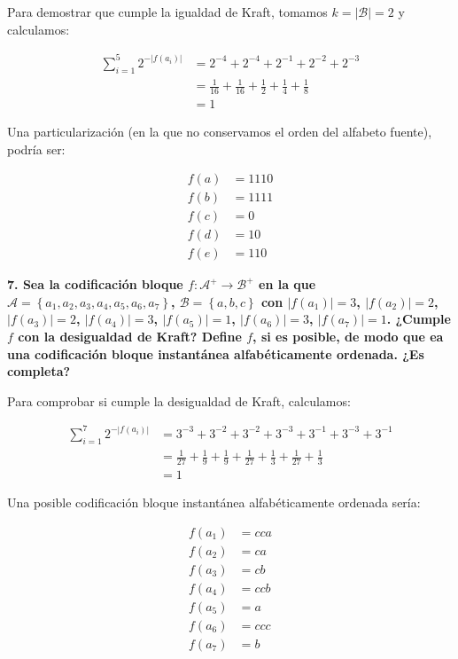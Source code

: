 \documentclass{article}
\begin{document}
Para demostrar que cumple la igualdad de Kraft, tomamos $k=\left|\mathcal{B}\right|=2$ y calculamos:

\begin{align*}
    \sum_{i=1}^{5}2^{-\left|f(a_i)\right|} &= 2^{-4} + 2^{-4} + 2^{-1} + 2^{-2} + 2^{-3}\\
    &= \frac{1}{16} + \frac{1}{16} + \frac{1}{2} + \frac{1}{4} + \frac{1}{8}\\
    &= 1
\end{align*}

Una particularización (en la que no conservamos el orden del alfabeto fuente), podría ser:

\begin{align*}
    f(a) &= 1110\\
    f(b) &= 1111\\
    f(c) &= 0\\
    f(d) &= 10\\
    f(e) &= 110
\end{align*}

\vspace{1cm}

\textbf{
7. Sea la codificación bloque $f:\mathcal{A}^+\rightarrow\mathcal{B}^+$ en la que $\mathcal{A}=\left\{a_1,a_2,a_3,a_4,a_5,a_6,a_7\right\}$, $\mathcal{B}=\left\{a,b,c\right\}$ con $\left|f(a_1)\right|=3$, $\left|f(a_2)\right|=2$, $\left|f(a_3)\right|=2$, $\left|f(a_4)\right|=3$, $\left|f(a_5)\right|=1$, $\left|f(a_6)\right|=3$, $\left|f(a_7)\right|=1$. ¿Cumple $f$ con la desigualdad de Kraft? Define $f$, si es posible, de modo que ea una codificación bloque instantánea alfabéticamente ordenada. ¿Es completa?
}

\vspace{0.5cm}

Para comprobar si cumple la desigualdad de Kraft, calculamos:

\begin{align*}
    \sum_{i=1}^{7}2^{-\left|f(a_i)\right|} &= 3^{-3} + 3^{-2} + 3^{-2} + 3^{-3} + 3^{-1} + 3^{-3} + 3^{-1}\\
    &= \frac{1}{27} + \frac{1}{9} + \frac{1}{9} + \frac{1}{27} + \frac{1}{3} + \frac{1}{27} + \frac{1}{3}\\
    &= 1
\end{align*}

Una posible codificación bloque instantánea alfabéticamente ordenada sería:

\begin{align*}
    f(a_1) &= cca\\
    f(a_2) &= ca\\
    f(a_3) &= cb\\
    f(a_4) &= ccb\\
    f(a_5) &= a\\
    f(a_6) &= ccc\\
    f(a_7) &= b
\end{align*}
\end{document}
